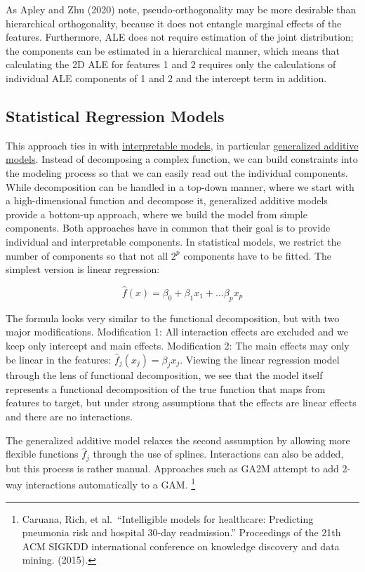 \documentclass[
  11pt,
]{scrbook}
\begin{document}
As Apley and Zhu (2020) note, pseudo-orthogonality may be more desirable than hierarchical orthogonality, because it does not entangle marginal effects of the features.
Furthermore, ALE does not require estimation of the joint distribution; the components can be estimated in a hierarchical manner, which means that calculating the 2D ALE for features 1 and 2 requires only the calculations of individual ALE components of 1 and 2 and the intercept term in addition.

\hypertarget{statistical-regression-models}{%
\subsection{Statistical Regression Models}\label{statistical-regression-models}}

This approach ties in with \protect\hyperlink{simple}{interpretable models}, in particular \protect\hyperlink{extend-lm}{generalized additive models}.
Instead of decomposing a complex function, we can build constraints into the modeling process so that we can easily read out the individual components.
While decomposition can be handled in a top-down manner, where we start with a high-dimensional function and decompose it, generalized additive models provide a bottom-up approach, where we build the model from simple components.
Both approaches have in common that their goal is to provide individual and interpretable components.
In statistical models, we restrict the number of components so that not all \(2^p\) components have to be fitted.
The simplest version is linear regression:

\[\hat{f}(x) = \beta_0 + \beta_1 x_1 + \ldots \beta_p x_p\]

The formula looks very similar to the functional decomposition, but with two major modifications.
Modification 1: All interaction effects are excluded and we keep only intercept and main effects.
Modification 2: The main effects may only be linear in the features: \(\hat{f}_j(x_j)=\beta_j{}x_j\).
Viewing the linear regression model through the lens of functional decomposition, we see that the model itself represents a functional decomposition of the true function that maps from features to target, but under strong assumptions that the effects are linear effects and there are no interactions.

The generalized additive model relaxes the second assumption by allowing more flexible functions \(\hat{f}_j\) through the use of splines.
Interactions can also be added, but this process is rather manual.
Approaches such as GA2M attempt to add 2-way interactions automatically to a GAM. \footnote{Caruana, Rich, et al.~``Intelligible models for healthcare: Predicting pneumonia risk and hospital 30-day readmission.'' Proceedings of the 21th ACM SIGKDD international conference on knowledge discovery and data mining. (2015).}
\end{document}
